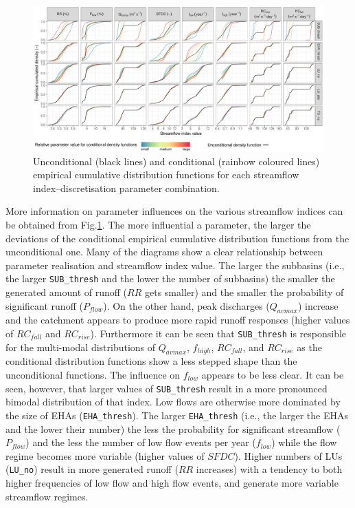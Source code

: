\begin{figure}[t]
\includegraphics[width=\linewidth]{../analysis/sensitivity/sensitivity_PAWN_ecdf.pdf}
\caption{Unconditional (black lines) and conditional (rainbow coloured lines) empirical cumulative distribution functions for each streamflow index--discretisation parameter combination.}
\label{fig:PAWNecdf}
\end{figure}

More information on parameter influences on the various streamflow indices can be obtained from Fig.\DIFaddbegin \DIFadd{\ }\DIFaddend \ref{fig:PAWNecdf}.
The more influential a parameter, the larger the deviations of the conditional empirical cumulative distribution functions from the unconditional one.
Many of the diagrams show a clear relationship between parameter realisation and streamflow index value.
The larger the subbasins (i.e., the larger \verb!SUB_thresh! and the lower the number of subbasins) the smaller the generated amount of runoff ($RR$ gets smaller) and the smaller the probability of significant runoff ($P_{flow}$).
On the other hand, peak discharges ($Q_{avmax}$) increase and the catchment appears to produce more rapid runoff responses (higher values of $RC_{fall}$ and $RC_{rise}$).
Furthermore it can be seen that \verb!SUB_thresh! is responsible for the multi-modal distributions of $Q_{avmax}$, $f_{high}$, $RC_{fall}$, and $RC_{rise}$ as the conditional distribution functions show a less stepped shape than the unconditional functions.
The influence on $f_{low}$ appears to be less clear.
It can be seen, however, that larger values of \verb!SUB_thresh! result in a more pronounced bimodal distribution of that index.
Low flows are otherwise more dominated by the size of EHAs (\verb!EHA_thresh!).
The larger \verb!EHA_thresh! (i.e., the larger the EHAs and the lower their number) the less the probability for significant streamflow ($P_{flow}$) and the less the number of low flow events per year ($f_{low}$) while the flow regime becomes more variable (higher values of $SFDC$).
Higher numbers of LUs (\verb!LU_no!) result in more generated runoff ($RR$ increases) with a tendency to both higher frequencies of low flow and high flow events, and generate more variable streamflow regimes.




